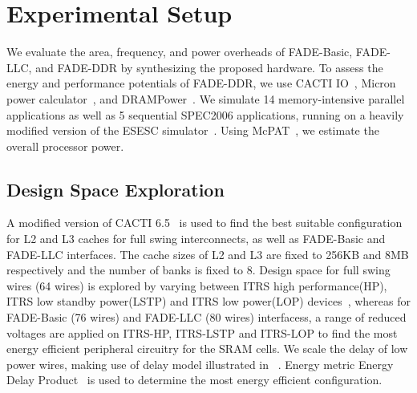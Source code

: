 \section{Experimental Setup}
\label{section:setup}

%
We evaluate the area, frequency, and power overheads of FADE-Basic, FADE-LLC, and FADE-DDR by synthesizing the proposed hardware. To assess the energy and performance potentials of FADE-DDR, we use CACTI IO~\cite{CACTI,jouppi2015cacti}, Micron power calculator~\cite{micron-ddr,micron-lpddr}, and DRAMPower~\cite{chandrasekar2012drampower}. We simulate 14 memory-intensive parallel applications as well as 5 sequential SPEC2006 applications, running on a heavily modified version of the ESESC simulator~\cite{ESESC}.
Using McPAT~\cite{McPat}, we estimate the overall processor power.

\subsection{Design Space Exploration}
A modified version of CACTI 6.5~\cite{CACTI} is used to find the best suitable configuration for L2 and L3 caches for full swing interconnects, as well as FADE-Basic and FADE-LLC interfaces. The cache sizes of L2 and L3 are fixed to 256KB and 8MB respectively and the number of banks is fixed to 8. Design space for full swing wires (64 wires) is explored by varying between ITRS high performance(HP), ITRS low standby power(LSTP) and ITRS low power(LOP) devices~\cite{NUCA}, whereas for FADE-Basic (76 wires) and FADE-LLC (80 wires) interfacess, a range of reduced voltages are applied on ITRS-HP, ITRS-LSTP and ITRS-LOP to find the most energy efficient peripheral circuitry for the SRAM cells. We scale the delay of low power wires, making use of delay model illustrated in ~\cite{scalingfactor}. Energy metric Energy Delay Product~\cite{edp} is used to determine the most energy efficient configuration.

